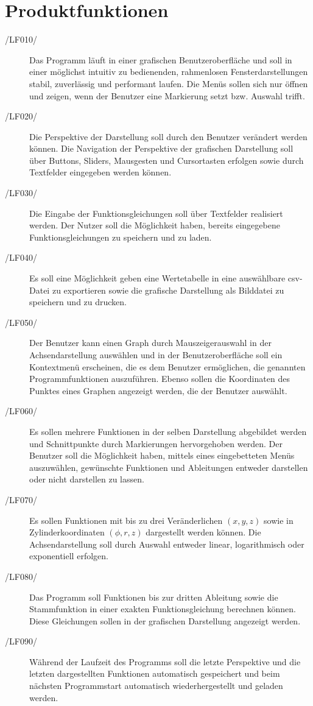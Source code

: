\documentclass[a4paper]{article}
\begin{document}
  \section{Produktfunktionen}
	  \begin{description}
		\item[/LF010/] Das Programm läuft in einer grafischen Benutzeroberfläche und soll in einer möglichst intuitiv zu bedienenden, rahmenlosen Fensterdarstellungen stabil, zuverlässig und performant laufen. Die Menüs sollen sich nur öffnen und zeigen, wenn der Benutzer eine Markierung setzt bzw. Auswahl trifft.
		\item[/LF020/] Die Perspektive der Darstellung soll durch den Benutzer verändert werden können. Die Navigation der Perspektive der grafischen Darstellung soll über Buttons, Sliders, Mausgesten und Cursortasten erfolgen sowie durch Textfelder eingegeben werden können.
		\item[/LF030/] Die Eingabe der Funktionsgleichungen soll über Textfelder realisiert werden. Der Nutzer soll die Möglichkeit haben, bereits eingegebene Funktionsgleichungen zu speichern und zu laden.
		\item[/LF040/] Es soll eine Möglichkeit geben eine Wertetabelle in eine auswählbare csv-Datei zu exportieren sowie die grafische Darstellung als Bilddatei zu speichern und zu drucken.
		\item[/LF050/] Der Benutzer kann einen Graph durch Mauszeigerauswahl in der Achsendarstellung auswählen und in der Benutzeroberfläche soll ein Kontextmenü erscheinen, die es dem Benutzer ermöglichen, die genannten Programmfunktionen auszuführen. Ebenso sollen die Koordinaten des Punktes eines Graphen angezeigt werden, die der Benutzer auswählt.
		\item[/LF060/] Es sollen mehrere Funktionen in der selben Darstellung abgebildet werden und Schnittpunkte durch Markierungen hervorgehoben werden. Der Benutzer soll die Möglichkeit haben, mittels eines eingebetteten Menüs auszuwählen, gewünschte Funktionen und Ableitungen entweder darstellen oder nicht darstellen zu lassen.
		\item[/LF070/] Es sollen Funktionen mit bis zu drei Veränderlichen $(x,y,z)$ sowie in Zylinderkoordinaten $(\phi,r,z)$ dargestellt werden können. Die Achsendarstellung soll durch Auswahl entweder linear, logarithmisch oder exponentiell erfolgen.
		\item[/LF080/] Das Programm soll Funktionen bis zur dritten Ableitung sowie die Stammfunktion in einer exakten Funktionsgleichung berechnen können. Diese Gleichungen sollen in der grafischen Darstellung angezeigt werden.
		\item[/LF090/] Während der Laufzeit des Programms soll die letzte Perspektive und die letzten dargestellten Funktionen automatisch gespeichert und beim nächsten Programmstart automatisch wiederhergestellt und geladen werden.
	  \end{description}
\end{document}
